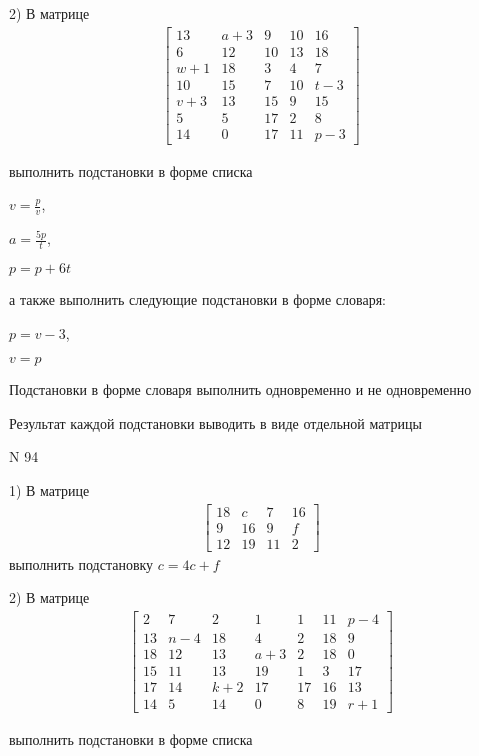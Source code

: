 \documentclass[11pt]{report}
\begin{document}
    2) В матрице
\begin{align*}
\left[\begin{matrix}13 & a + 3 & 9 & 10 & 16\\6 & 12 & 10 & 13 & 18\\w + 1 & 18 & 3 & 4 & 7\\10 & 15 & 7 & 10 & t - 3\\v + 3 & 13 & 15 & 9 & 15\\5 & 5 & 17 & 2 & 8\\14 & 0 & 17 & 11 & p - 3\end{matrix}\right]
\end{align*}

выполнить подстановки в форме списка

$v=\frac{p}{v}$,

$a=\frac{5 p}{t}$,

$p=p + 6 t$

а также выполнить следующие подстановки в форме словаря:

$p=v - 3$,

$v=p$


    Подстановки в форме словаря выполнить одновременно и не одновременно


    Результат каждой подстановки выводить в виде отдельной матрицы

\newpage
N 94


    1) В матрице
\begin{align*}
\left[\begin{matrix}18 & c & 7 & 16\\9 & 16 & 9 & f\\12 & 19 & 11 & 2\end{matrix}\right]
\end{align*}
выполнить подстановку $c=4 c + f$


    2) В матрице
\begin{align*}
\left[\begin{matrix}2 & 7 & 2 & 1 & 1 & 11 & p - 4\\13 & n - 4 & 18 & 4 & 2 & 18 & 9\\18 & 12 & 13 & a + 3 & 2 & 18 & 0\\15 & 11 & 13 & 19 & 1 & 3 & 17\\17 & 14 & k + 2 & 17 & 17 & 16 & 13\\14 & 5 & 14 & 0 & 8 & 19 & r + 1\end{matrix}\right]
\end{align*}

выполнить подстановки в форме списка
\end{document}
